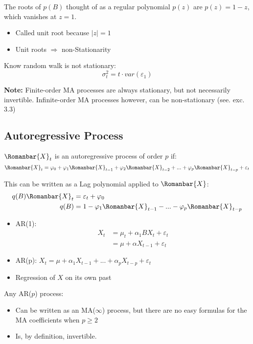 The roots of $p(B)$ thought of as a regular polynomial $p(z)$ are $p(z)=1-z$, which vanishes at $z=1$.
\begin{itemize}
    \item Called unit root because $|z|=1$
    \item Unit roots $\Rightarrow$ non-Stationarity
\end{itemize}
 Know random walk is not stationary:
\[\sigma^2_t=t \cdot var(\varepsilon_1)\]

\textbf{Note:} Finite-order MA processes are always stationary, but not necessarily invertible. Infinite-order MA processes however, can be non-stationary (see. exc. 3.3)

\subsection{Autoregressive Process}

$\Romanbar{X}_t$ is an autoregressive process of order $p$ if:
\[\Romanbar{X}_t=\varphi_0+\varphi_1\Romanbar{X}_{t-1}+\varphi_2\Romanbar{X}_{t-2}+...+\varphi_p\Romanbar{X}_{t-p}+\varepsilon_t\]

This can be written as a Lag polynomial applied to $\Romanbar{X}$:
\begin{align*}
    q(B)\Romanbar{X}_t&=\varepsilon_t+\varphi_0\\
    q(B)&=1-\varphi_1\Romanbar{X}_{t-1}-...-\varphi_p\Romanbar{X}_{t-p}
\end{align*}

\begin{itemize}
    \item AR(1):
    \begin{align*}
        X_t&=\mu_t+\alpha_1 BX_t +\varepsilon_t\\
        &=\mu+\alpha X_{t-1}+\varepsilon_t
    \end{align*}
    \item AR(p): $X_t=\mu+\alpha_1 X_{t-1}+...+\alpha_pX_{t-p}+\varepsilon_t $
    \item[] Regression of $X$ on its own past
\end{itemize}

Any AR($p$) process:
\begin{itemize}
    \item Can be written as an MA($\infty$) process, but there are no easy formulas for the MA coefficients when $p\geq 2$
    \item Is, by definition, invertible.
\end{itemize}

